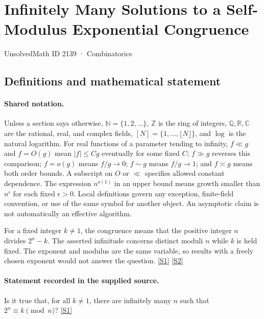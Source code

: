 \documentclass[11pt,a4paper]{article}
\newcommand{\N}{\mathbb{N}}
\newcommand{\Z}{\mathbb{Z}}
\newcommand{\Q}{\mathbb{Q}}
\newcommand{\R}{\mathbb{R}}
\newcommand{\C}{\mathbb{C}}
\newcommand{\sref}[2]{\hyperlink{source:#1:#2}{[S#2]}}
\begin{document}

\setcounter{section}{2138}

\section{Infinitely Many Solutions to a Self-Modulus Exponential Congruence}\label{2139}

{\small\sffamily UnsolvedMath ID 2139 · Combinatorics}

\subsection{Definitions and mathematical statement}

\paragraph{Shared notation.}Unless a section says otherwise, $\N=\{1,2,\ldots\}$,
$\Z$ is the ring of integers, $\Q,\R,\C$ are the rational, real, and complex
fields, $[N]=\{1,\ldots,\lfloor N\rfloor\}$, and $\log$ is the natural
logarithm. For real functions of a parameter tending to infinity,
$f\ll g$ and $f=O(g)$ mean $|f|\leq Cg$ eventually for some fixed $C$;
$f\gg g$ reverses this comparison; $f=o(g)$ means $f/g\to0$;
$f\sim g$ means $f/g\to1$; and $f\asymp g$ means both order bounds.
A subscript on $O$ or $\ll$ specifies allowed constant dependence.
The expression $n^{o(1)}$ in an upper bound means growth smaller than
$n^\epsilon$ for each fixed $\epsilon>0$. Local definitions govern any
exception, finite-field convention, or use of the same symbol for another
object. An asymptotic claim is not automatically an effective algorithm.



For a fixed integer $k\ne1$, the congruence means that the positive integer $n$ divides $2^n-k$. The asserted infinitude concerns distinct moduli $n$ while $k$ is held fixed. The exponent and modulus are the same variable, so results with a freely chosen exponent would not answer the question. \sref{2139}{1} \sref{2139}{2}

\paragraph{Statement recorded in the supplied source.}
Is it true that, for all $k\neq 1$, there are infinitely many $n$ such that $2^n\equiv k\pmod{n}$? \sref{2139}{1}
\end{document}
